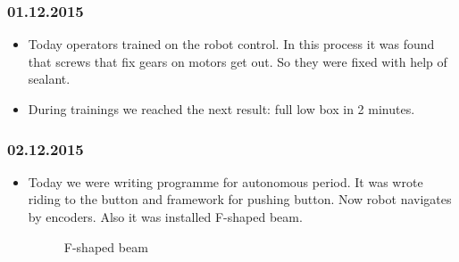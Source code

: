 \subsubsection{01.12.2015}
\begin{itemize}
\item Today operators trained on the robot control. In this process it was found that screws that fix gears on motors get out. So they were fixed with help of sealant. 
\item During trainings we reached the next result: full low box in 2 minutes.
\end{itemize}
\subsubsection{02.12.2015}
\begin{itemize}
\item Today we were writing programme for autonomous period. It was wrote riding to the button and framework for pushing button. Now robot navigates by encoders. Also it was installed F-shaped beam.
\begin{figure}[H]
	\begin{minipage}[h]{1\linewidth}
		\caption{F-shaped beam}
	\end{minipage}
\end{figure} 
\end{itemize}
\fillpage